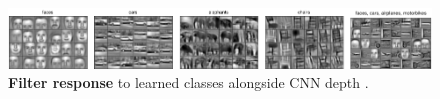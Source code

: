 
\begin{figure}[t]
    \centering
    \scriptsize
    \includegraphics[width=\textwidth]{fig/rel/images/conv_layers.pdf}
    \caption{\textbf{Filter response} to learned classes alongside CNN depth \autocite{lee2009convolutional}.}
    \label{fig:cnn_depth}
\end{figure}